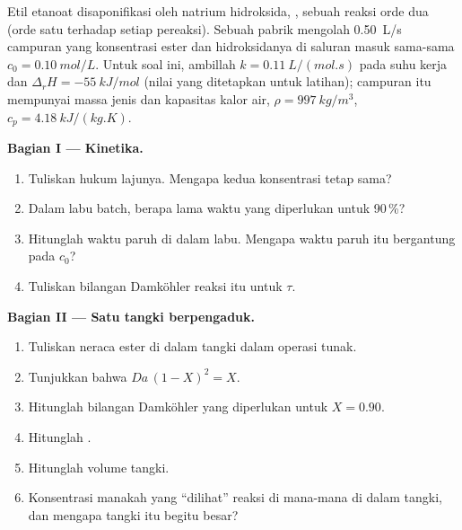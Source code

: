 \begin{problem}
\label{pb:b2:continuous-reactors:1}
Etil etanoat disaponifikasi oleh natrium hidroksida,
, sebuah reaksi orde dua (orde
satu terhadap setiap pereaksi). Sebuah pabrik mengolah \qty{0.50}{L/s}
campuran yang konsentrasi ester dan hidroksidanya di saluran masuk
sama-sama $c_0 =
\qty{0.10}{mol/L}$. Untuk soal ini, ambillah
$k = \qty{0.11}{L/(mol.s)}$ pada suhu kerja dan
$\Delta_r H = \qty{-55}{kJ/mol}$ (nilai yang ditetapkan untuk latihan);
campuran itu mempunyai massa jenis dan kapasitas kalor air,
$\rho = \qty{997}{kg/m^3}$, $c_p = \qty{4.18}{kJ/(kg.K)}$.

\medskip
\noindent\textbf{Bagian I --- Kinetika.}
\begin{enumerate}
  \item Tuliskan hukum lajunya. Mengapa kedua konsentrasi tetap sama?
  \item Dalam labu batch, berapa lama waktu yang diperlukan untuk 
        90\,\%?
  \item Hitunglah waktu paruh di dalam labu. Mengapa waktu paruh itu
        bergantung pada $c_0$?
  \item Tuliskan bilangan Damköhler reaksi itu untuk  $\tau$.
\end{enumerate}

\medskip
\noindent\textbf{Bagian II --- Satu tangki berpengaduk.}
\begin{enumerate}[resume]
  \item Tuliskan neraca ester di dalam tangki dalam operasi tunak.
  \item Tunjukkan bahwa $Da\,(1 - X)^2 = X$.
  \item Hitunglah bilangan Damköhler yang diperlukan untuk $X = 0.90$.
  \item Hitunglah .
  \item Hitunglah volume tangki.
  \item Konsentrasi manakah yang ``dilihat'' reaksi di mana-mana di dalam
        tangki, dan mengapa tangki itu begitu besar?
\end{enumerate}


\end{problem}
